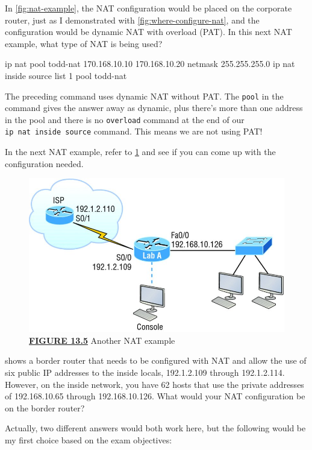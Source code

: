 In \cref{fig:nat-example}, the NAT configuration would be placed on the corporate router, just as I
demonstrated with \cref{fig:where-configure-nat}, and the configuration would be dynamic NAT with overload (PAT).
In this next NAT example, what type of NAT is being used?

\begin{cli}
ip nat pool todd-nat 170.168.10.10 170.168.10.20 netmask 255.255.255.0
ip nat inside source list 1 pool todd-nat
\end{cli}

The preceding command uses dynamic NAT without PAT. The \texttt{pool} in
the command gives the answer away as dynamic, plus there's more than one
address in the pool and there is no \texttt{overload} command at the end
of our \texttt{ip\ nat\ inside\ source} command. This means we are not
using PAT!

In the next NAT example, refer to \cref{fig:another-nat-example} and see if you can come up with the configuration needed.

\begin{figure}
\centering
   \includegraphics{images/c13f005.jpg}
\caption{{\protect\hyperlink{c13.xhtmlux5cux23figureanchor13-5}{\textbf{FIGURE
13.5}} Another NAT example}}
   \label{fig:another-nat-example}
\end{figure}

 shows a border router that needs to be configured with NAT and
allow the use of six public IP addresses to the inside locals,
192.1.2.109 through 192.1.2.114. However, on the inside network, you
have 62 hosts that use the private addresses of 192.168.10.65 through
192.168.10.126. What would your NAT configuration be on the border
router?

Actually, two different answers would both work here, but the following would be my first choice based on the exam objectives:

